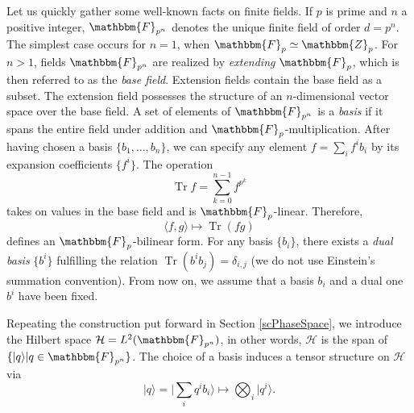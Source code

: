 \documentclass[aps,twocolumn,floatfix]{revtex4}
\def\tuple#1.{\langle#1\rangle}
\def\ket#1.{|#1\rangle}
\def\ZZ{\mathbbm{Z}}
\def\FF{\mathbbm{F}}
\def\H{\mathcal{H}}
\DeclareMathOperator{\Tr}{Tr}
\begin{document}
Let us quickly gather some well-known facts on finite fields.  If $p$
is prime and $n$ a positive integer, $\FF_{p^n}$ denotes the unique
finite field of order $d=p^n$. The simplest case occurs for $n=1$,
when $\FF_p\simeq \ZZ_p$. For $n>1$, fields $\FF_{p^n}$ are realized
by \emph{extending} $\FF_p$, which is then referred to as the
\emph{base field}. Extension fields contain the base field as a
subset.  The extension field possesses the structure of an
$n$-dimensional vector space over the base field. A set of elements of
$\FF_{p^n}$ is a \emph{basis} if it spans the entire field under
addition and $\FF_p$-multiplication. After having chosen a basis
$\{b_1, \dots, b_n\}$, we can specify any element $f=\sum_i f^i b_i$
by its expansion coefficients $\{f^i\}$. The operation 
\begin{equation*}
	\Tr f = \sum_{k=0}^{n-1} f^{p^k}
\end{equation*}
takes on values in the base field and is $\FF_p$-linear. Therefore, 
\begin{equation*}
	\tuple f,g. \mapsto \Tr (fg)
\end{equation*}
defines an $\FF_p$-bilinear form. For any basis $\{b_i\}$,
there exists a \emph{dual basis} $\{b^i\}$ fulfilling the
relation
	$\Tr (b^i b_j) = \delta_{i,j}$
(we do not use Einstein's summation convention). From now on, we
assume that a basis $b_i$ and a dual one $b^i$ have been fixed.

Repeating the construction put forward in Section \ref{scPhaseSpace}, we
introduce the Hilbert space $\H=L^2(\FF_{p^n})$, in other words, $\H$
is the span of $\{\ket q.|q\in \FF_{p^n}\}$. The choice of a basis
induces a tensor structure on $\H$ via
\begin{equation*}
	\ket q.=\ket \sum_i q^i b_i.\mapsto \bigotimes_i \ket q^i..
\end{equation*}
\end{document}
